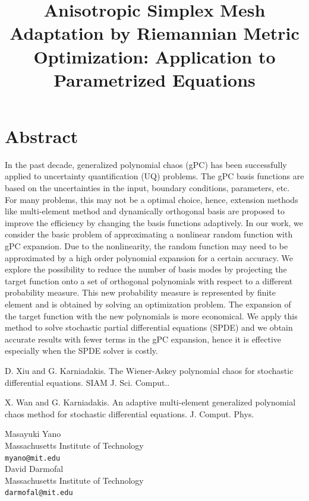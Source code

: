 \documentclass[article,A4,11pt]{llncs}%
\begin{document}
\section*{Abstract}
In the past decade, generalized polynomial chaos (gPC) has been successfully applied to uncertainty quantification (UQ) problems. The gPC basis functions are based on the uncertainties in the input, boundary conditions, parameters, etc. For many problems, this may not be a optimal choice, hence, extension methods like multi-element method and dynamically orthogonal basis are proposed to improve the efficiency by changing the basis functions adaptively. In our work, we consider the basic problem of approximating a nonlinear random function with gPC expansion. Due to the nonlinearity, the random function may need to be approximated by a high order polynomial expansion for a certain accuracy. We explore the possibility to reduce the number of basis modes by projecting the target function onto a set of orthogonal polynomials with respect to a different probability measure. This new probability measure is represented by finite element and is obtained by solving an optimization problem. The expansion of the target function with the new polynomials is more economical. We apply this method to solve stochastic partial differential equations (SPDE) and we obtain accurate results with fewer terms in the gPC expansion, hence it is effective especially when the SPDE solver is costly.


\begin{thebibliography}{10}
{\sc D. Xiu and G. Karniadakis}. {The Wiener-Askey polynomial chaos for stochastic differential equations}. SIAM J. Sci. Comput..

{\sc X. Wan and G. Karniadakis}. {An adaptive multi-element generalized polynomial chaos method for stochastic differential equations}. J. Comput. Phys.
\end{thebibliography}

\title{Anisotropic Simplex Mesh Adaptation by Riemannian Metric Optimization: Application to Parametrized Equations}
 \author{} \institute{}
\maketitle
\begin{center}
{\large Masayuki  Yano}\\
Massachusetts Institute of Technology\\
{\tt myano@mit.edu}
\\ \vspace{4mm}
{\large David Darmofal}\\
Massachusetts Institute of Technology\\
{\tt darmofal@mit.edu}
\end{center}
\end{document}

